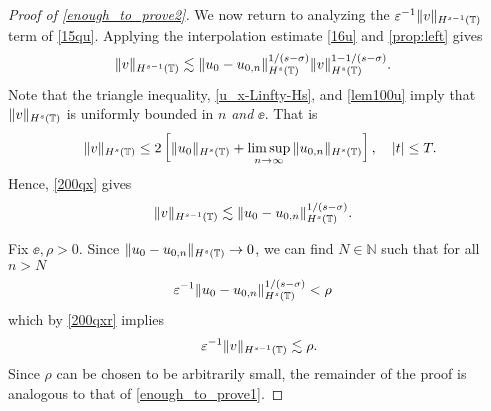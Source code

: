 \begin{proof}[Proof of \eqref{enough_to_prove2}]
We now return to analyzing the $\varepsilon^{-1}
\|v\|_{H^{s-1}(\mathbb{T})}$ term of \eqref{15qu}.
Applying the 
interpolation estimate \eqref{16u} and
\cref{prop:left} gives
%
%
%
%
\begin{equation}
\begin{split}
\label{200qx}
\|v\|_{H^{s-1}(\mathbb{T})} 
& \lesssim  
\|u_0-u_{0,n}\|_{H^s(\mathbb{T})}^{1/(s-\sigma)}\|v\|_{H^s(\mathbb{T})}^{1- 
1/(s-\sigma)}.
\end{split}
\end{equation}
%
%
%
Note that the triangle inequality, \eqref{u_x-Linfty-Hs},
and \eqref{lem100u} 
imply that $\|v\|_{H^s(\mathbb{T})}$ is uniformly bounded in $n$ \emph{and} $\ee$. 
That is
%
%
\begin{equation*}
\begin{split}
	\|v\|_{H^s(\mathbb{T})} \le 2 \left[ \|u_0 \|_{H^s(\mathbb{T})} + \limsup_{n \to 
	\infty} 
	\|u_{0,n}\|_{H^s(\mathbb{T})} 
\right], \quad |t| \le T.
\label{growth_v}
\end{split}
\end{equation*}
%
%
Hence, \eqref{200qx} gives
%
%
\begin{equation}
\begin{split}
\label{200qxr}
\|v\|_{H^{s-1}(\mathbb{T})} 
& \lesssim  
\|u_0-u_{0,n}\|_{H^s(\mathbb{T})}^{1/(s-\sigma)}.
\end{split}
\end{equation}

Fix $\ee, \rho > 0$. Since $\|u_0 -
u_{0,n} \|_{H^s(\mathbb{T})} \to 0$, we
can find $N \in \mathbb{N}$ such that for all $n > N$
%
%
\begin{equation*}
\begin{split}
\varepsilon^{-1} \|u_0-u_{0,n}\|_{H^s(\mathbb{T})}^{1/(s-\sigma)}
& < \rho
\label{uniform_n}
\end{split}
\end{equation*}
%
%
which by \eqref{200qxr} implies
%
%
\begin{equation}
	\label{end-decay}
	\begin{split}
		\varepsilon^{-1} \|v\|_{H^{s-1}(\mathbb{T})} \lesssim \rho.
	\end{split}
\end{equation}
%
%
%
%
Since $\rho$ can be chosen to be arbitrarily small, the remainder of the 
proof is analogous to that of \eqref{enough_to_prove1}. 
\end{proof}
%
%
%
%
%
%
%
